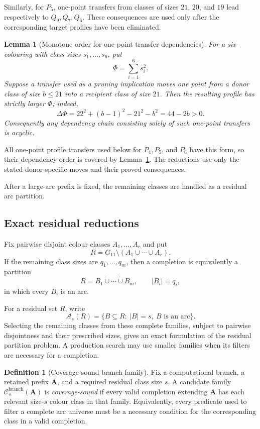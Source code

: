 \documentclass[11pt]{article}
\newtheorem{lemma}[theorem]{Lemma}
\theoremstyle{definition}
\newtheorem{definition}[theorem]{Definition}
\theoremstyle{remark}
\renewcommand{\le}{\leqslant}
\begin{document}
Similarly, for \(P_5\), one-point transfers from classes of sizes \(21\),
\(20\), and \(19\) lead respectively to \(Q_9,Q_7,Q_6\).  These consequences
are used only after the corresponding target profiles have been eliminated.

\begin{lemma}[Monotone order for one-point transfer dependencies]
\label{lem:g11-transfer-potential}
For a six-colouring with class sizes \(s_1,\ldots,s_6\), put
\[
  \Phi=\sum_{i=1}^{6}s_i^2.
\]
Suppose a transfer used as a pruning implication moves one point from a donor
class of size \(b\le21\) into a recipient class of size \(21\).  Then the
resulting profile has strictly larger \(\Phi\); indeed,
\[
  \Delta\Phi
  =22^2+(b-1)^2-21^2-b^2
  =44-2b>0.
\]
Consequently any dependency chain consisting solely of such one-point
transfers is acyclic.
\end{lemma}

All one-point profile transfers used below for \(P_4,P_5\), and \(P_6\)
have this form, so their dependency order is covered by
Lemma~\ref{lem:g11-transfer-potential}.  The reductions use only the stated
donor-specific moves and their proved consequences.

After a large-arc prefix is fixed, the remaining classes are handled as a
residual arc partition.

\subsection{Exact residual reductions}
\label{sec:g11-residual-reductions}

Fix pairwise disjoint colour classes \(A_1,\ldots,A_r\) and put
\[
  R=G_{11}\setminus(A_1\cup\cdots\cup A_r).
\]
If the remaining class sizes are \(q_1,\ldots,q_m\), then a completion is
equivalently a partition
\[
  R=B_1\dot\cup\cdots\dot\cup B_m,
  \qquad |B_i|=q_i,
\]
in which every \(B_i\) is an arc.

For a residual set \(R\), write
\[
 \mathcal A_s(R)=\{B\subseteq R:\ |B|=s,\ B\text{ is an arc}\}.
\]
Selecting the remaining classes from these complete families, subject to
pairwise disjointness and their prescribed sizes, gives an exact formulation
of the residual partition problem.  A production search may use smaller
families when its filters are necessary for a completion.

\begin{definition}[Coverage-sound branch family]
\label{def:g11-coverage-sound}
Fix a computational branch, a retained prefix \(\mathbf A\), and a required
residual class size \(s\).  A candidate family
\(\mathcal C^{\mathrm{branch}}_s(\mathbf A)\) is \emph{coverage-sound} if every
valid completion extending \(\mathbf A\) has each relevant size-\(s\) colour
class in that family.  Equivalently, every predicate used to filter a
complete arc universe must be a necessary condition for the corresponding
class in a valid completion.
\end{definition}
\end{document}
